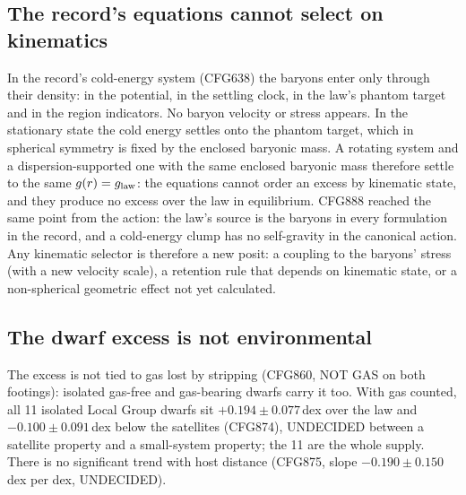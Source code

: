 \documentclass[10pt]{article}
\begin{document}
\subsection{The record's equations cannot select on kinematics}
In the record's cold-energy system (CFG638) the baryons enter only through their density: in the potential, in the settling clock, in the law's phantom target and in the region indicators. No baryon velocity or stress appears. In the stationary state the cold energy settles onto the phantom target, which in spherical symmetry is fixed by the enclosed baryonic mass. A rotating system and a dispersion-supported one with the same enclosed baryonic mass therefore settle to the same $g(r)=g_{\rm law}$: the equations cannot order an excess by kinematic state, and they produce no excess over the law in equilibrium. CFG888 reached the same point from the action: the law's source is the baryons in every formulation in the record, and a cold-energy clump has no self-gravity in the canonical action. Any kinematic selector is therefore a new posit: a coupling to the baryons' stress (with a new velocity scale), a retention rule that depends on kinematic state, or a non-spherical geometric effect not yet calculated.

\subsection{The dwarf excess is not environmental}
The excess is not tied to gas lost by stripping (CFG860, NOT GAS on both footings): isolated gas-free and gas-bearing dwarfs carry it too. With gas counted, all 11 isolated Local Group dwarfs sit $+0.194\pm0.077$\,dex over the law and $-0.100\pm0.091$\,dex below the satellites (CFG874), UNDECIDED between a satellite property and a small-system property; the 11 are the whole supply. There is no significant trend with host distance (CFG875, slope $-0.190\pm0.150$\,dex per dex, UNDECIDED).
\end{document}
